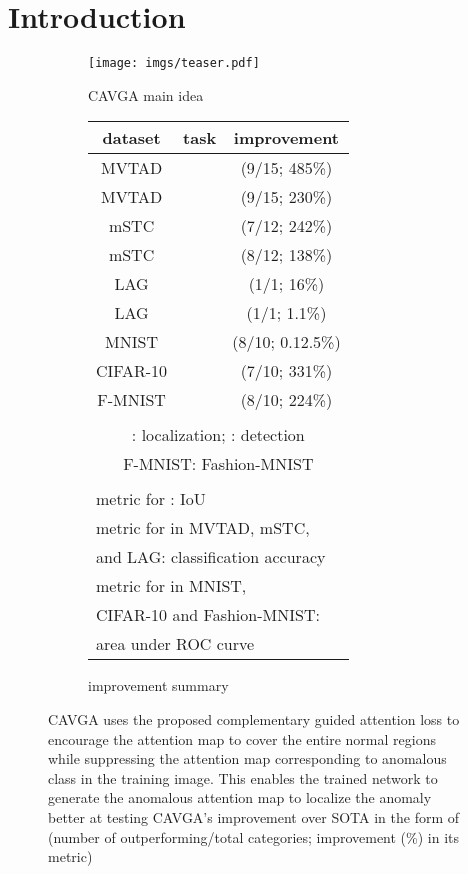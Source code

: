 \documentclass[runningheads]{llncs}
\begin{document}
\section{Introduction}
\label{introduction}


\begin{figure}[!ht]
  
    \begin{subfigure}[b]{0.6\linewidth}
    \texttt{[image: imgs/teaser.pdf]}
    \caption{CAVGA main idea}
    \label{teaser}
    \end{subfigure}
    \hfil
    \begin{subfigure}[b]{0.35\linewidth}
    \scriptsize
    \centering
    \begin{tabular}{@{}c@{}c@{}c@{}}
    \toprule
    dataset &task &improvement\\
    \midrule
    MVTAD \cite{bergmann2019mvtec} & &(9/15; 485\%) \\ 
    MVTAD \cite{bergmann2019mvtec} & &(9/15; 230\%)\\
    mSTC \cite{liu2018future} & &(7/12; 242\%)\\
    mSTC \cite{liu2018future} & &(8/12; 138\%)\\
    LAG \cite{Li_2019_CVPR} & & (1/1; 16\%)\\
    LAG \cite{Li_2019_CVPR} & &(1/1; 1.1\%)\\
    MNIST \cite{lecun1998gradient} & &(8/10; 0.12.5\%)\\
    CIFAR-10 \cite{krizhevsky2009learning} & &(7/10; 331\%)\\
    F-MNIST \cite{xiao2017fashion} & &(8/10; 224\%)\\
    
    \bottomrule
    \\
    \multicolumn{3}{c}{: localization; : detection}\\
    \multicolumn{3}{c}{F-MNIST: Fashion-MNIST \cite{xiao2017fashion}}\\
    \\
    \multicolumn{3}{l}{ metric for  : IoU}\\
    \multicolumn{3}{l}{ metric for  in MVTAD, mSTC,}\\
    \multicolumn{3}{l}{and LAG: classification accuracy}\\
    \multicolumn{3}{l}{ metric for  in MNIST,}\\
    \multicolumn{3}{l}{CIFAR-10 and Fashion-MNIST:}\\
    \multicolumn{3}{l}{area under ROC curve}\\
    \end{tabular} 
    \caption{improvement summary}
    \label{improvement_table}
    \end{subfigure}
    \caption{ CAVGA uses the proposed complementary guided attention loss to encourage the attention map to cover the entire normal regions while suppressing the attention map corresponding to anomalous class in the training image. This enables the trained network to generate the anomalous attention map to localize the anomaly better at testing  CAVGA's improvement over SOTA in the form of (number of outperforming/total categories; improvement (\%) in its metric)}
    

\end{figure}
\end{document}
